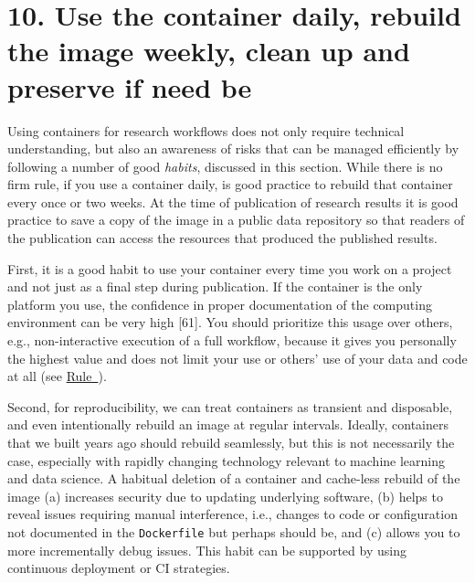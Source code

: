 \documentclass[10pt,letterpaper]{article}
\begin{document}
\hypertarget{use-the-container-daily-rebuild-the-image-weekly-clean-up-and-preserve-if-need-be}{%
\section*{10. Use the container daily, rebuild the image weekly, clean
up and preserve if need
be}\label{use-the-container-daily-rebuild-the-image-weekly-clean-up-and-preserve-if-need-be}}

  \label{rule:usage} 

Using containers for research workflows does not only require technical
understanding, but also an awareness of risks that can be managed
efficiently by following a number of good \emph{habits}, discussed in
this section. While there is no firm rule, if you use a container daily,
is good practice to rebuild that container every once or two weeks. At
the time of publication of research results it is good practice to save
a copy of the image in a public data repository so that readers of the
publication can access the resources that produced the published
results.

First, it is a good habit to use your container every time you work on a
project and not just as a final step during publication. If the
container is the only platform you use, the confidence in proper
documentation of the computing environment can be very high {[}61{]}.
You should prioritize this usage over others, e.g., non-interactive
execution of a full workflow, because it gives you personally the
highest value and does not limit your use or others' use of your data
and code at all (see
\hyperref[{rule:interactive}]{Rule~}).

Second, for reproducibility, we can treat containers as transient and
disposable, and even intentionally rebuild an image at regular
intervals. Ideally, containers that we built years ago should rebuild
seamlessly, but this is not necessarily the case, especially with
rapidly changing technology relevant to machine learning and data
science. A habitual deletion of a container and cache-less rebuild of
the image (a) increases security due to updating underlying software,
(b) helps to reveal issues requiring manual interference, i.e., changes
to code or configuration not documented in the \texttt{Dockerfile} but
perhaps should be, and (c) allows you to more incrementally debug
issues. This habit can be supported by using continuous deployment or CI
strategies.
\end{document}
